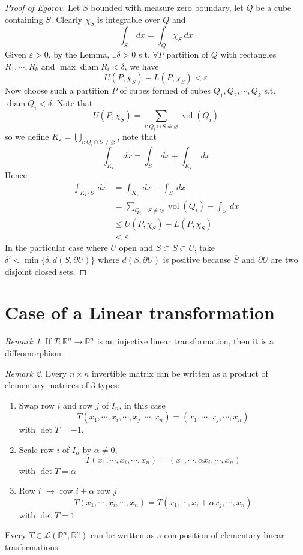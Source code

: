 \documentclass[11pt,openany]{book}
\theoremstyle{plain}
\theoremstyle{definition}
\theoremstyle{remark}
\newtheorem{remark}{Remark}[chapter]
\newcommand{\R}{\mathbb{R}}
\newcommand{\set}[1]{\{ #1 \}}
\newcommand{\vol}{\operatorname{vol}}
\begin{document}
\begin{proof}[Proof of Egorov]
    Let $S$ bounded with measure zero boundary, let $Q$ be a cube containing $S$. Clearly $\chi_S$ is integrable over $Q$ and 
    $$\int_S \ dx = \int_Q \chi_S \ dx$$
    Given $\varepsilon > 0$, by the Lemma, $\exists \delta > 0$ s.t. $\forall P$ partition of $Q$ with rectangles $R_1, \cdots, R_k$ and $\max \operatorname{diam} R_i < \delta$, 
    we have 
    $$U(P, \chi_S) - L(P, \chi_S) < \varepsilon$$
    Now choose such a partition $P$ of cubes formed of cubes $Q_1, Q_2, \cdots, Q_k$ s.t. $\operatorname{diam} Q_i < \delta$. 
    Note that 
    $$U(P, \chi_S) = \sum_{i \colon Q_i \cap S \ne \varnothing} \vol (Q_i)$$
    so we define $K_\varepsilon = \bigcup_{i \colon Q_i \cap S \ne \varnothing}$, note that 
    $$\int_{K_\varepsilon} \ dx = \int_S \ dx + \int_{K_\varepsilon} \ dx$$
    Hence 
    \begin{align*}
        \int_{K_\varepsilon \setminus S } \ dx &= \int_{K_\varepsilon} \ dx - \int_S \ dx \\
        &= \sum_{Q_i \cap S \ne \varnothing} \vol (Q_i) - \int_S \ dx \\
        &\le U(P, \chi_S) - L(P, \chi_S) \\
        &< \varepsilon
    \end{align*} 
    In the particular case where $U$ open and $S \subset \overline{S} \subset U$, take $\delta' < \min \set{\delta, d(S, \partial U)}$ where $d(S, \partial U)$ is positive 
    because $\overline{S}$ and $\partial U$ are two disjoint closed sets.
\end{proof}

\section{Case of a Linear transformation}
\begin{remark}
    If $T \colon \R^n \to \R^n$ is an injective linear transformation, then it is a diffeomorphism. 
\end{remark}

\begin{remark}
    Every $n \times n$ invertible matrix can be written as a product of elementary matrices of $3$ types: 
    \begin{enumerate}
        \item Swap row $i$ and row $j$ of $I_n$, in this case 
        $$T(x_1,\cdots, x_i, \cdots, x_j, \cdots, x_n) = (x_1, \cdots, x_j, \cdots, x_n)$$
        with $\det T = -1$.
        \item Scale row $i$ of $I_n$ by $\alpha \ne 0$, 
        $$T(x_1, \cdots, x_i, \cdots, x_n) = (x_1, \cdots, \alpha x_i, \cdots, x_n)$$
        with $\det T = \alpha$
        \item Row $i$ $\to$ row $i + \alpha$ row $j$ 
        $$T(x_1, \cdots, x_i, \cdots, x_n) = T(x_1, \cdots, x_i + \alpha x_j, \cdots, x_n)$$
        with $\det T = 1$
    \end{enumerate}
    Every $T \in \mathcal{L} (\R^n, \R^n)$ can be written as a composition of elementary linear trasformations. 
\end{remark}
\end{document}
